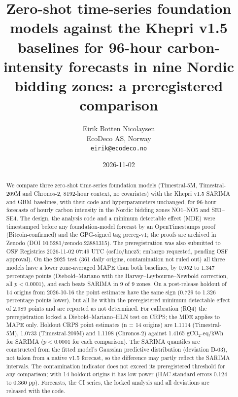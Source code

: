 \documentclass[11pt]{article}
\title{Zero-shot time-series foundation models against the Khepri v1.5 baselines for 96-hour
carbon-intensity forecasts in nine Nordic bidding zones: a preregistered comparison}
\author{Eirik Botten Nicolaysen\\EcoDeco AS, Norway\\\texttt{eirik@ecodeco.no}}
\date{2026-11-02}
\begin{document}
\sloppy\setlength{\emergencystretch}{3em}
\maketitle

\begin{abstract}
We compare three zero-shot time-series foundation models (Timestral-5M, Timestral-209M and
Chronos-2, 8192-hour context, no covariates) with the Khepri v1.5 SARIMA and GBM baselines,
with their code and hyperparameters unchanged, for 96-hour forecasts of hourly carbon intensity in the Nordic bidding zones NO1--NO5 and SE1--SE4. The
design, the analysis code and a minimum detectable effect (MDE) were timestamped before any
foundation-model forecast by an OpenTimestamps proof (Bitcoin-confirmed) and the GPG-signed tag
prereg-v1; the proofs are archived in Zenodo (DOI 10.5281/zenodo.23881315). The preregistration was also
submitted to OSF Registries 2026-11-02 07:49 UTC (osf.io/hncz5; embargo requested, pending OSF approval). On the 2025 test (361 daily origins,
contamination not ruled out) all three models have a lower zone-averaged MAPE than both baselines,
by 0.952 to 1.347 percentage points (Diebold--Mariano with the Harvey--Leybourne--Newbold
correction, all $p<0.0001$), and each beats SARIMA in 9 of 9 zones. On a post-release holdout of
14 origins from 2026-10-16 the point estimates have the same sign (0.729 to 1.326 percentage
points lower), but all lie within the preregistered minimum detectable effect of 2.989 points and
are reported as not determined. For calibration (RQ4) the preregistration locked a Diebold--Mariano--HLN test on CRPS;
the MDE applies to MAPE only. Holdout CRPS point estimates (n = 14 origins) are
1.1114 (Timestral-5M), 1.0733 (Timestral-209M) and 1.1198 (Chronos-2) against 1.4165 gCO$_2$-eq/kWh
for SARIMA ($p<0.0001$ for each comparison). The SARIMA quantiles are constructed from the fitted
model's Gaussian predictive distribution (deviation D-03), not taken from a native v1.5 forecast, so the
difference may partly reflect the SARIMA intervals. The contamination indicator does not exceed its
preregistered threshold for any comparison; with 14 holdout origins it has low power (HAC
standard errors 0.124 to 0.360 pp). Forecasts, the CI series,
the locked analysis and all deviations are released with the code.
\end{abstract}





\end{document}
